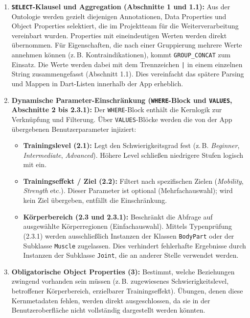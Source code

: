 \begin{enumerate}
    \item \textbf{\texttt{SELECT}-Klausel und Aggregation (Abschnitte 1 und 1.1):}
    Aus der Ontologie werden gezielt diejenigen Annotationen, Data Properties und Object Properties selektiert, die im Projektteam für die Weiterverarbeitung vereinbart wurden. Properties mit eineindeutigen Werten werden direkt übernommen. Für Eigenschaften, die nach einer Gruppierung mehrere Werte annehmen können (z.\,B. Kontraindikationen), kommt \texttt{GROUP\_CONCAT} zum Einsatz. Die Werte werden dabei mit dem Trennzeichen \texttt{|} in einem einzelnen String zusammengefasst (Abschnitt 1.1). Dies vereinfacht das spätere Parsing und Mappen in Dart-Listen innerhalb der App erheblich.

    \item \textbf{Dynamische Parameter-Einschränkung (\texttt{WHERE}-Block und \texttt{VALUES}, Abschnitte 2 bis 2.3.1):}
    Der \texttt{WHERE}-Block enthält die Kernlogik zur Verknüpfung und Filterung. Über \texttt{VALUES}-Blöcke werden die von der App übergebenen Benutzerparameter injiziert:
    \begin{itemize}
        \item \textbf{Trainingslevel (2.1):} Legt den Schwierigkeitsgrad fest (z.\,B. \textit{Beginner}, \textit{Intermediate}, \textit{Advanced}). Höhere Level schließen niedrigere Stufen logisch mit ein.
        \item \textbf{Trainingseffekt / Ziel (2.2):} Filtert nach spezifischen Zielen (\textit{Mobility}, \textit{Strength} etc.). Dieser Parameter ist optional (Mehrfachauswahl); wird kein Ziel übergeben, entfällt die Einschränkung.
        \item \textbf{Körperbereich (2.3 und 2.3.1):} Beschränkt die Abfrage auf ausgewählte Körperregionen (Einfachauswahl). Mittels Typenprüfung (2.3.1) werden ausschließlich Instanzen der Klassen \texttt{BodyPart} oder der Subklasse \texttt{Muscle} zugelassen. Dies verhindert fehlerhafte Ergebnisse durch Instanzen der Subklasse \texttt{Joint}, die an anderer Stelle verwendet werden.
    \end{itemize}

    \item \textbf{Obligatorische Object Properties (3):}
    Bestimmt, welche Beziehungen zwingend vorhanden sein müssen (z.\,B. zugewiesenes Schwierigkeitslevel, betroffener Körperbereich, erzielbarer Trainingseffekt). Übungen, denen diese Kernmetadaten fehlen, werden direkt ausgeschlossen, da sie in der Benutzeroberfläche nicht vollständig dargestellt werden könnten.


\end{enumerate}
